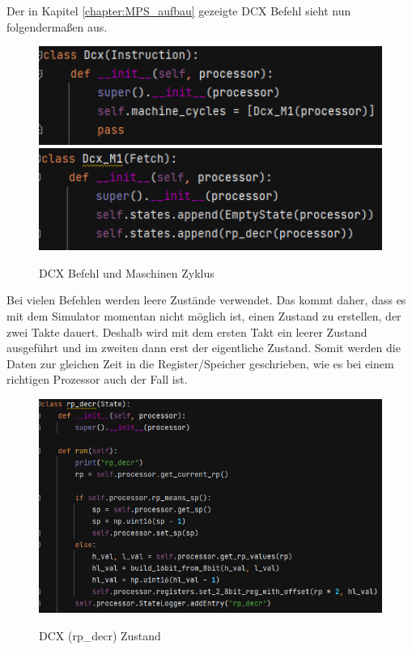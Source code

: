 \documentclass[12pt]{article}
\newcommand{\imgSpaceBefore}{\\[0.2cm]}
\begin{document}
\noindent
Der in Kapitel \ref{chapter:MPS_aufbau} gezeigte DCX Befehl sieht nun folgendermaßen aus.
\imgSpaceBefore
\begin{figure}[H]
\caption{DCX Befehl und Maschinen Zyklus}
\centering
\includegraphics[width=15cm]{bilder/dcx_inst}
\includegraphics[width=15cm]{bilder/dcx_mc}
\label{fig:Dcx_instr}
\end{figure}

\noindent
Bei vielen Befehlen werden leere Zustände verwendet. Das kommt daher, dass es mit dem Simulator momentan nicht möglich ist, einen Zustand zu erstellen, der zwei Takte dauert. Deshalb wird mit dem ersten Takt ein leerer Zustand ausgeführt und im zweiten dann erst der eigentliche Zustand. Somit werden die Daten zur gleichen Zeit in die Register/Speicher geschrieben, wie es bei einem richtigen Prozessor auch der Fall ist.
\imgSpaceBefore
\begin{figure}[H]
\caption{DCX (rp\_decr) Zustand}
\centering
\includegraphics[width=15cm]{bilder/dcx_state}
\label{fig:Dcx_state}
\end{figure}
\end{document}
